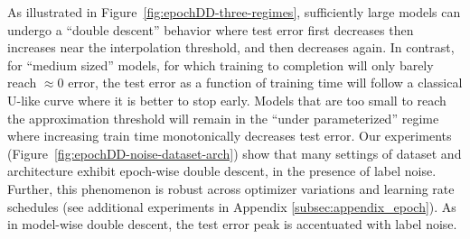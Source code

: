As illustrated in Figure~\ref{fig:epochDD-three-regimes}, 
sufficiently large models can
undergo
a ``double descent'' behavior where test error first decreases then increases near the interpolation
threshold, and then decreases again.
In contrast, for ``medium sized'' models, for which training to completion will only barely reach $\approx 0$ error, the
test error as a function of training time will follow a classical U-like curve where it is better to stop early.
Models that are too small to reach the approximation threshold will remain in the ``under parameterized'' regime where increasing
train time monotonically decreases test error.
Our experiments
(Figure~\ref{fig:epochDD-noise-dataset-arch}) show that many settings
of dataset and architecture exhibit epoch-wise double descent, in the presence of label noise.
Further, this phenomenon
is robust across optimizer variations and learning rate schedules (see additional experiments in Appendix \ref{subsec:appendix_epoch}).
As in model-wise double descent, the test error peak is accentuated with label noise. 

